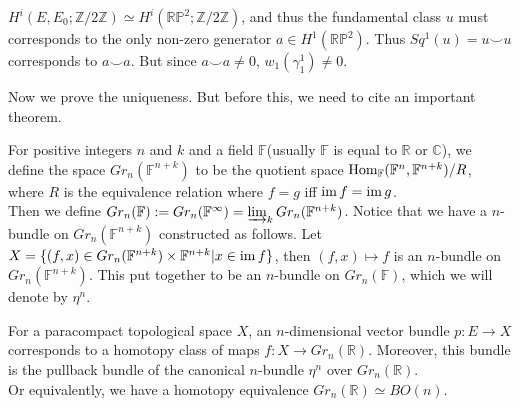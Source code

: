 \begin{const}
\begin{enumerate}
			$H^i(E,E_0;\mathbb{Z}/2\mathbb{Z})\simeq H^i(\mathbb{RP}^2;\mathbb{Z}/2\mathbb{Z})$, and thus the fundamental class $u$ must corresponds to the only non-zero generator $a\in H^1(\mathbb{RP}^2)$. Thus $Sq^1(u)=u\smile u$ corresponds to $a\smile a$. But since $a\smile a\ne0$, $w_1(\gamma_1^1)\ne0$. 
		\end{enumerate}
	\end{const}

	Now we prove the uniqueness. But before this, we need to cite an important theorem. 
	\begin{defn}\label{Defn_Grassmannian}
		For positive integers $n$ and $k$ and a field $\mathbb{F}$(usually $\mathbb{F}$ is equal to $\mathbb{R}$ or $\mathbb{C}$), we define the space $Gr_n(\mathbb{F}^{n+k})$ to be the quotient space $\operatorname{\mathrm{Hom}}_\mathbb{F}(\mathbb{F}^n,\mathbb{F}^{n+k})/R$, where $R$ is the equivalence relation where $f=g$ iff $\operatorname{\mathrm{im}} f=\operatorname{\mathrm{im}} g$. \\
		Then we define $Gr_n(\mathbb{F}):=Gr_n(\mathbb{F}^\infty)=\varinjlim_kGr_n(\mathbb{F}^{n+k})$. Notice that we have a $n$-bundle on $Gr_n(\mathbb{F}^{n+k})$ constructed as follows. Let $X=\{(f,x)\in Gr_n(\mathbb{F}^{n+k})\times\mathbb{F}^{n+k}|x\in\operatorname{\mathrm{im}} f\}$, then $(f,x)\mapsto f$ is an $n$-bundle on $Gr_n(\mathbb{F}^{n+k})$. This put together to be an $n$-bundle on $Gr_n(\mathbb{F})$, which we will denote by $\eta^n$. 
	\end{defn}
	\begin{thm}\label{Real_Grassmannian}
		For a paracompact topological space $X$, an $n$-dimensional vector bundle $p:E\to X$ corresponds to a homotopy class of maps $f:X\to Gr_n(\mathbb{R})$. Moreover, this bundle is the pullback bundle of the canonical $n$-bundle $\eta^n$ over $Gr_n(\mathbb{R})$. \\
		Or equivalently, we have a homotopy equivalence $Gr_n(\mathbb{R})\simeq BO(n)$. 
	\end{thm} 

